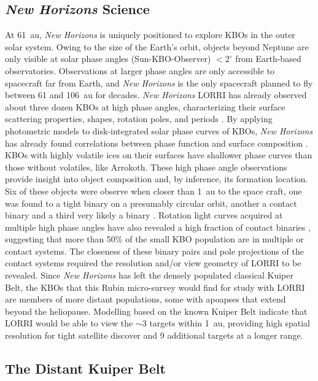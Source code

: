 \documentclass[modern,preprint]{aastex7}
\begin{document}
\subsection{{\it New Horizons} Science}
At 61~au, {\it New Horizons} is uniquely positioned to explore KBOs in the outer solar system.
Owing to the size of the Earth's orbit, objects beyond Neptune are only visible at solar phase angles (Sun-KBO-Observer) $<2^\circ$ from Earth-based observatories.
Observations at larger phase angles are only accessible to spacecraft far from Earth, and {\it New Horizons} is the only spacecraft planned to fly between 61 and 106~au for decades.
{\it New Horizons} LORRI has already observed about three dozen KBOs at high phase angles, characterizing their surface scattering properties, shapes, rotation poles, and periods \citep{Porter2016, Verbiscer2019, Verbiscer2022}.
By applying photometric models to disk-integrated solar phase curves of KBOs, {\it New Horizons} has already found correlations between phase function and surface composition \citep{Verbiscer2022}. 
KBOs with highly volatile ices on their surfaces have shallower phase curves than those without volatiles, like Arrokoth. 
These high phase angle observations provide insight into object composition and, by inference, its formation location.
Six of these objects were observe when closer than 1~au to the space craft, one was found to a tight binary on a presumably circular orbit, another a contact binary and a third very likely a binary \citep{2022PSJ.....3...46W}.
Rotation light curves acquired at multiple high phase angles have also revealed a high fraction of contact binaries \citep{Porter2024}, suggesting that more than 50\% of the small KBO population are in multiple or contact systems. The closeness of these binary pairs and pole projections of the contact systems required the resolution and/or view geometry of LORRI to be revealed.
Since {\it New Horizons} has left the densely populated classical Kuiper Belt, the KBOs that this Rubin micro-survey would find for study with LORRI are members of more distant populations, some with apoapses that extend beyond the heliopause.
Modelling based on the known Kuiper Belt indicate that LORRI would be able to view the $\sim$3 targets within 1~au, providing high spatial resolution for tight satellite discover and 9 additional targets at a longer range. 

\subsection{The Distant Kuiper Belt}
\end{document}
